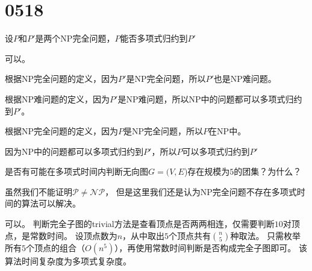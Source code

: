 \section{0518}\label{sec:0518}
\begin{questions}
    \question 设$P$和$P'$是两个NP完全问题，$P$能否多项式归约到$P'$

    \begin{solution}

        可以。

        根据NP完全问题的定义，因为$P'$是NP完全问题，所以$P'$也是NP难问题。

        根据NP难问题的定义，因为$P'$是NP难问题，所以NP中的问题都可以多项式归约到$P'$。

        根据NP完全问题的定义，因为$P$是NP完全问题，所以$P$在NP中。

        因为NP中的问题都可以多项式归约到$P'$，所以$P$可以多项式归约到$P'$

    \end{solution}


    \question 是否有可能在多项式时间内判断无向图$G=(V,E$)存在规模为$5$的团集？为什么？

    \begin{solution}
        {
            \color{red}
            虽然我们不能证明$\mathcal{P} \ne \mathcal{NP}$，
            但是这里我们还是认为NP完全问题不存在多项式时间的算法可以解决。
        }

        可以。
        判断完全子图的trivial方法是查看顶点是否两两相连，仅需要判断$10$对顶点，是常数时间。
        设顶点数为$n$，从中取出$5$个顶点共有$\binom{n}{5}$种取法。
        只需枚举所有$5$个顶点的组合（$O(n^5)$），再使用常数时间判断是否构成完全子图即可。
        该算法时间复杂度为多项式复杂度。
    \end{solution}

\end{questions}
